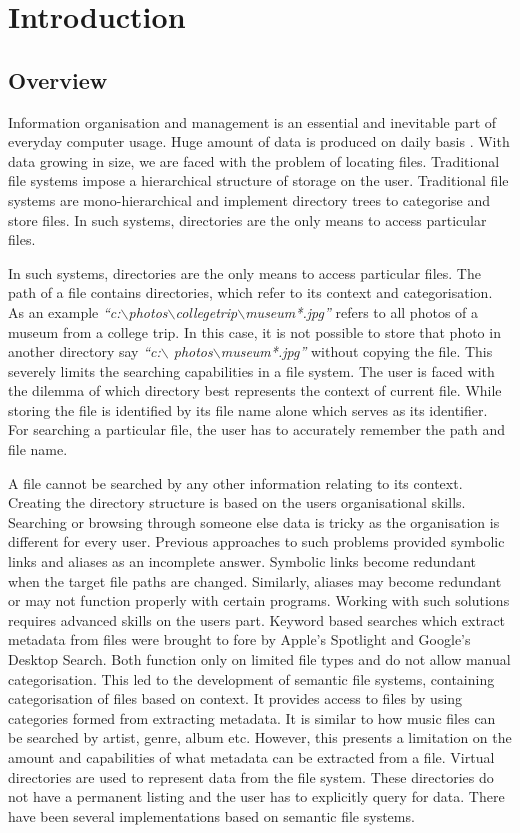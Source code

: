 \chapter{Introduction}
\section{Overview}

Information organisation \cite{FUSE} and management is an essential and inevitable part of everyday computer usage. Huge amount of data is produced on daily basis \cite{GOOGLEDESKTOP}. With data growing in size, we are faced with the problem of locating files. Traditional file systems impose a  hierarchical structure of storage on the user. Traditional file systems are mono-hierarchical and implement directory trees to categorise and store files. In such systems, directories are the only means to access particular files.

In such systems, directories are the only means to access particular files. The path of a file contains directories, which refer to its context and categorisation. As an example \textit{``c:$\backslash$photos$\backslash$collegetrip$\backslash$museum*.jpg''} refers to all photos of a museum from a college trip. In this case, it is not possible to store that photo in another directory say \textit{``c:$\backslash$ photos$\backslash$museum*.jpg''} without copying the file. This severely limits the searching capabilities in a file system. The user is faced with the dilemma of which directory best represents the context of current file. While storing the file is identified by its file name alone which serves as its identifier. For searching a particular file, the user has to accurately remember the path and file name.

A file cannot be searched by any other information relating to its context. Creating the directory structure is based on the users organisational skills. Searching or browsing through someone else data is tricky as the organisation is different for every user. Previous approaches to such problems provided symbolic links and aliases as an incomplete answer. Symbolic links become redundant when the target file paths are changed. Similarly, aliases may become redundant or may not function properly with certain programs. Working with such solutions requires advanced skills on the users part. Keyword based searches which extract metadata from files were brought to fore by Apple's Spotlight and Google's Desktop Search. Both function only on limited file types and do not allow manual categorisation. This led to the development of semantic file systems, containing categorisation of files based on context. It provides access to files by using categories formed from extracting metadata. It is similar to how music files can be searched by artist, genre, album etc. However, this presents a limitation on the amount and capabilities of what metadata can be extracted from a file. Virtual directories are used to represent data from the file system. These directories do not have a permanent listing and the user has to explicitly query for data. There have been several implementations based on semantic file systems.

